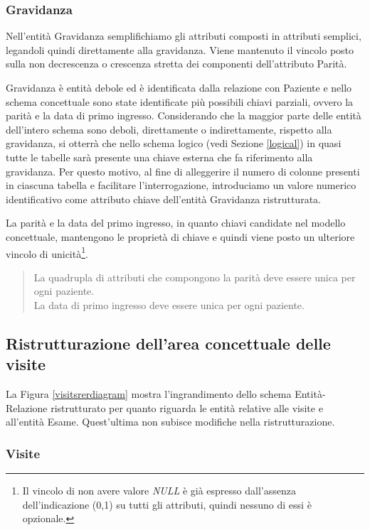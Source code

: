 \subsubsection{Gravidanza}

Nell'entità Gravidanza semplifichiamo gli attributi composti in attributi semplici, legandoli quindi direttamente alla gravidanza.
Viene mantenuto il vincolo posto sulla non decrescenza o crescenza stretta dei componenti dell'attributo Parità.

Gravidanza è entità debole ed è identificata dalla relazione con Paziente e nello schema concettuale sono state identificate più possibili chiavi parziali, ovvero la parità e la data di primo ingresso.
Considerando che la maggior parte delle entità dell'intero schema sono deboli, direttamente o indirettamente, rispetto alla gravidanza, si otterrà che nello schema logico (vedi Sezione \ref{logical}) in quasi tutte le tabelle sarà presente una chiave esterna che fa riferimento alla gravidanza.
Per questo motivo, al fine di alleggerire il numero di colonne presenti in ciascuna tabella e facilitare l'interrogazione, introduciamo un valore numerico identificativo come attributo chiave dell'entità Gravidanza ristrutturata.

La parità e la data del primo ingresso, in quanto chiavi candidate nel modello concettuale, mantengono le proprietà di chiave e quindi viene posto un ulteriore vincolo di unicità\footnote{
    Il vincolo di non avere valore \emph{NULL} è già espresso dall'assenza dell'indicazione (0,1) su tutti gli attributi, quindi nessuno di essi è opzionale.
}.
\begin{quote}
La quadrupla di attributi che compongono la parità deve essere unica per ogni paziente. \\
La data di primo ingresso deve essere unica per ogni paziente.
\end{quote}

\subsection{Ristrutturazione dell'area concettuale delle visite}

La Figura \ref{visitsrerdiagram} mostra l'ingrandimento dello schema Entità-Relazione ristrutturato per quanto riguarda le entità relative alle visite e all'entità Esame.
Quest'ultima non subisce modifiche nella ristrutturazione.

\subsubsection{Visite}

